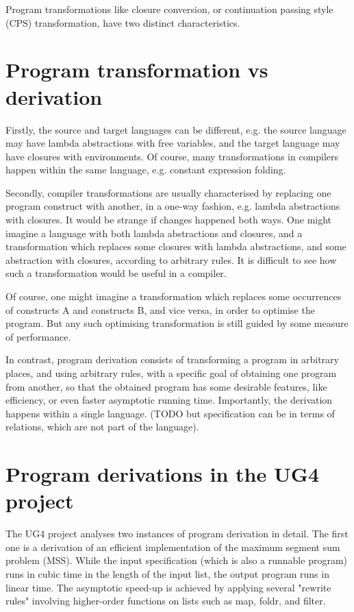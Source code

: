\documentclass[bsc,frontabs,twoside,singlespacing,parskip,deptreport]{infthesis}
\theoremstyle{definition}
\begin{document}
Program transformations like closure conversion, or continuation
passing style (CPS) transformation, have two distinct characteristics.

\section{Program transformation vs derivation}
\label{sec:progr-transf-vs}

Firstly, the source and target languages can be different, e.g. the
source language may have lambda abstractions with free variables, and
the target language may have closures with environments. Of course,
many transformations in compilers happen within the same language,
e.g. constant expression folding.

Secondly, compiler transformations are usually characterised by
replacing one program construct with another, in a one-way fashion,
e.g. lambda abstractions with closures. It would be strange if changes
happened both ways. One might imagine a language with both lambda
abstractions and closures, and a transformation which replaces some
closures with lambda abstractions, and some abstraction with closures,
according to arbitrary rules. It is difficult to see how such a
transformation would be useful in a compiler.

Of course, one might imagine a transformation which replaces some
occurrences of constructs A and constructs B, and vice versa, in order
to optimise the program. But any such optimising transformation is
still guided by some measure of performance.

In contrast, program derivation consists of transforming a program in
arbitrary places, and using arbitrary rules, with a specific goal of
obtaining one program from another, so that the obtained program has
some desirable features, like efficiency, or even faster asymptotic
running time. Importantly, the derivation happens within a single
language. (TODO but specification can be in terms of relations, which
are not part of the language).

\section{Program derivations in the UG4 project}
\label{sec:progr-deriv-ug4}

The UG4 project analyses two instances of program derivation in
detail. The first one is a derivation of an efficient implementation
of the maximum segment sum problem (MSS). While the input
specification (which is also a runnable program) runs in cubic time in
the length of the input list, the output program runs in linear
time. The asymptotic speed-up is achieved by applying several "rewrite
rules" involving higher-order functions on lists such as map, foldr,
and filter.
\end{document}
